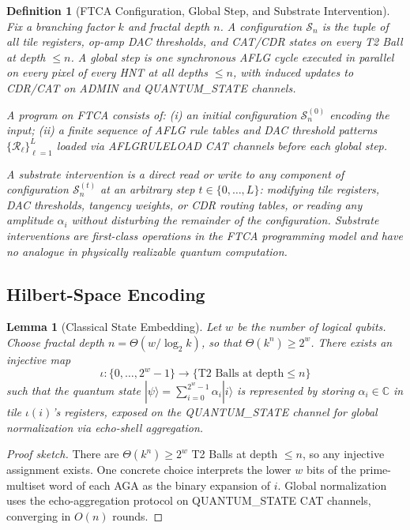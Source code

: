 \documentclass[11pt,letterpaper]{article}
\newtheorem{lemma}[theorem]{Lemma}
\newtheorem{definition}{Definition}
\begin{document}
\begin{definition}[FTCA Configuration, Global Step, and Substrate Intervention]
\label{def:model}
Fix a branching factor $k$ and fractal depth $n$. A \emph{configuration} $\mathcal{S}_n$ is the tuple of all tile registers, op-amp DAC thresholds, and CAT/CDR states on every T2 Ball at depth $\le n$. A \emph{global step} is one synchronous AFLG cycle executed in parallel on every pixel of every HNT at all depths $\le n$, with induced updates to CDR/CAT on ADMIN and QUANTUM\_STATE channels.

A \emph{program} on FTCA consists of: (i) an initial configuration $\mathcal{S}_n^{(0)}$ encoding the input; (ii) a finite sequence of AFLG rule tables and DAC threshold patterns $\{\mathcal{R}_\ell\}_{\ell=1}^L$ loaded via AFLGRULELOAD CAT channels before each global step.

A \emph{substrate intervention} is a direct read or write to any component of configuration $\mathcal{S}_n^{(t)}$ at an arbitrary step $t \in \{0,\dots,L\}$: modifying tile registers, DAC thresholds, tangency weights, or CDR routing tables, or reading any amplitude $\alpha_i$ without disturbing the remainder of the configuration. Substrate interventions are first-class operations in the FTCA programming model and have no analogue in physically realizable quantum computation.
\end{definition}

\subsection{Hilbert-Space Encoding}

\begin{lemma}[Classical State Embedding]
\label{lem:embedding}
Let $w$ be the number of logical qubits. Choose fractal depth $n = \Theta(w / \log_2 k)$, so that $\Theta(k^n) \ge 2^w$. There exists an injective map
\[
\iota: \{0, \dots, 2^w - 1\} \to \{\text{T2 Balls at depth} \le n\}
\]
such that the quantum state $|\psi\rangle = \sum_{i=0}^{2^w-1} \alpha_i |i\rangle$ is represented by storing $\alpha_i \in \mathbb{C}$ in tile $\iota(i)$'s registers, exposed on the QUANTUM\_STATE channel for global normalization via echo-shell aggregation.
\end{lemma}

\begin{proof}[Proof sketch]
There are $\Theta(k^n) \ge 2^w$ T2 Balls at depth $\le n$, so any injective assignment exists. One concrete choice interprets the lower $w$ bits of the prime-multiset word of each AGA as the binary expansion of $i$. Global normalization uses the echo-aggregation protocol on QUANTUM\_STATE CAT channels, converging in $O(n)$ rounds.
\end{proof}
\end{document}
